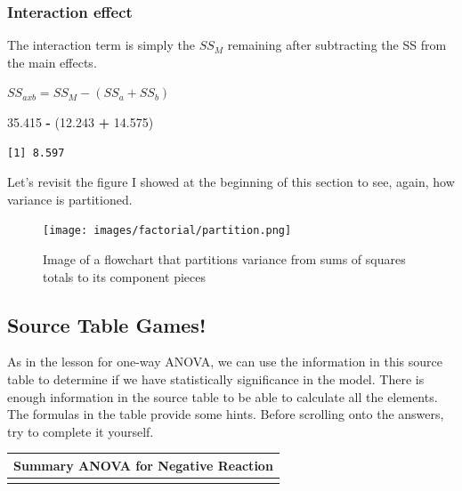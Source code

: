 \documentclass[
  11pt,
]{book}
\newenvironment{Shaded}{\begin{snugshade}}{\end{snugshade}}
\newcommand{\FloatTok}[1]{\textcolor[rgb]{0.06,0.06,0.06}{#1}}
\newcommand{\NormalTok}[1]{#1}
\newcommand{\SpecialCharTok}[1]{\textcolor[rgb]{0.43,0.43,0.43}{\textbf{#1}}}
\begin{document}
\hypertarget{interaction-effect}{%
\subsubsection{Interaction effect}\label{interaction-effect}}

The interaction term is simply the \(SS_M\) remaining after subtracting the SS from the main effects.

\(SS_{axb} = SS_M - (SS_a + SS_b)\)

\begin{Shaded}
\begin{Highlighting}[]
\FloatTok{35.415} \SpecialCharTok{{-}}\NormalTok{ (}\FloatTok{12.243} \SpecialCharTok{+} \FloatTok{14.575}\NormalTok{)}
\end{Highlighting}
\end{Shaded}

\begin{verbatim}
[1] 8.597
\end{verbatim}

Let's revisit the figure I showed at the beginning of this section to see, again, how variance is partitioned.

\begin{figure}
\centering
\texttt{[image: images/factorial/partition.png]}
\caption{Image of a flowchart that partitions variance from sums of squares totals to its component pieces}
\end{figure}

\hypertarget{source-table-games-1}{%
\subsection{Source Table Games!}\label{source-table-games-1}}

As in the lesson for one-way ANOVA, we can use the information in this source table to determine if we have statistically significance in the model. There is enough information in the source table to be able to calculate all the elements. The formulas in the table provide some hints. Before scrolling onto the answers, try to complete it yourself.

\begin{longtable}[]{@{}l@{}}
\toprule\noalign{}
Summary ANOVA for Negative Reaction \\
\midrule\noalign{}
\endhead
\bottomrule\noalign{}
\endlastfoot
\end{longtable}
\end{document}
